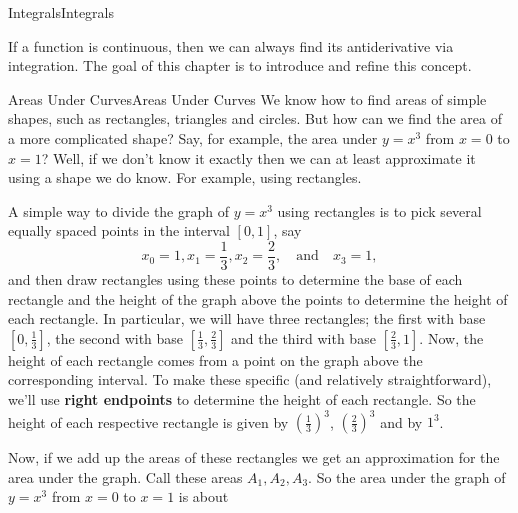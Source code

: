 \documentclass[10pt,]{book}
\newcommand{\terminology}[1]{\textbf{#1}}
\numberwithin{equation}{section}
\begin{document}
%
%
\typeout{************************************************}
\typeout{************************************************}
%
\begin{chapterptx}{Integrals}{}{Integrals}{}{}\label{integrals}
\begin{introduction}{}%
\hypertarget{p-401}{}%
If a function is continuous, then we can always find its antiderivative via integration. The goal of this chapter is to introduce and refine this concept.%
\end{introduction}%
%
%
\typeout{************************************************}
\typeout{************************************************}
%
\begin{sectionptx}{Areas Under Curves}{}{Areas Under Curves}{}{}\label{section-areas-under-curves}
\hypertarget{p-402}{}%
We know how to find areas of simple shapes, such as rectangles, triangles and circles. But how can we find the area of a more complicated shape? Say, for example, the area under \(y=x^{3}\) from \(x=0\) to \(x=1\)? Well, if we don't know it exactly then we can at least approximate it using a shape we do know. For example, using rectangles.%
\par
\hypertarget{p-403}{}%
A simple way to divide the graph of \(y=x^{3}\) using rectangles is to pick several equally spaced points in the interval \([0,1]\), say%
\begin{equation*}
x_{0} = 1, x_{1} = \frac{1}{3}, x_{2} = \frac{2}{3}, \quad\text{and}\quad x_{3} = 1,
\end{equation*}
and then draw rectangles using these points to determine the base of each rectangle and the height of the graph above the points to determine the height of each rectangle. In particular, we will have three rectangles; the first with base \([0,\frac{1}{3}]\), the second with base \([\frac{1}{3},\frac{2}{3}]\) and the third with base \([\frac{2}{3},1]\). Now, the height of each rectangle comes from a point on the graph above the corresponding interval. To make these specific (and relatively straightforward), we'll use \terminology{right endpoints} to determine the height of each rectangle. So the height of each respective rectangle is given by \((\frac{1}{3})^{3}\), \((\frac{2}{3})^{3}\) and by \(1^{3}\).%
\par
\hypertarget{p-404}{}%
Now, if we add up the areas of these rectangles we get an approximation for the area under the graph. Call these areas \(A_{1},A_{2},A_{3}\). So the area under the graph of \(y = x^{3}\) from \(x=0\) to \(x=1\) is about%

\end{sectionptx}
\end{chapterptx}
\end{document}
